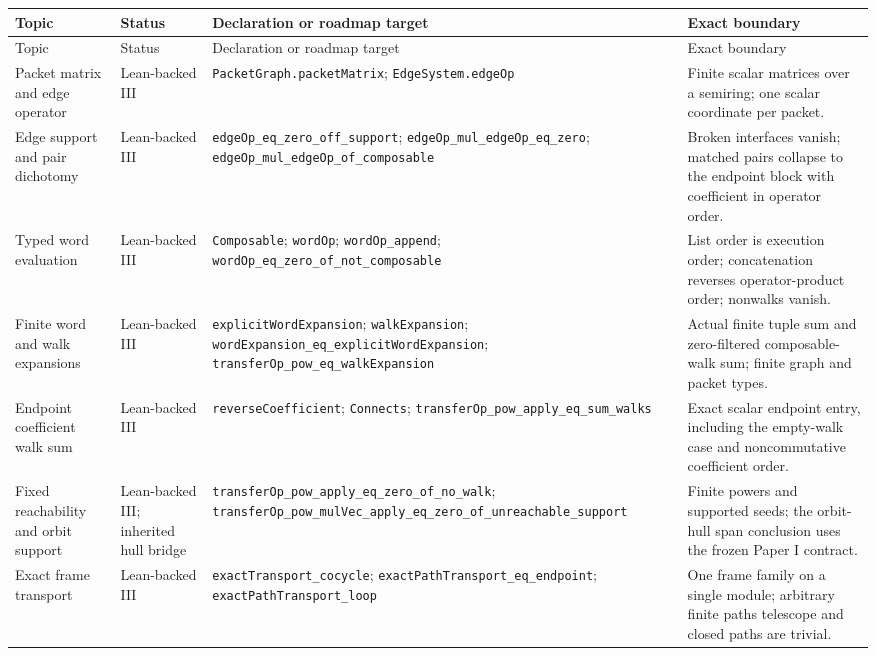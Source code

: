 \documentclass[11pt,a4paper]{article}
\theoremstyle{plain}
\theoremstyle{definition}
\theoremstyle{remark}
\newcommand{\leanname}[1]{\nolinkurl{#1}}
\begin{document}
\small
\begin{longtable}{L{0.17\textwidth}L{0.18\textwidth}L{0.25\textwidth}L{0.22\textwidth}}
\toprule
Topic & Status & Declaration or roadmap target & Exact boundary\\
\midrule
\endfirsthead
\toprule
Topic & Status & Declaration or roadmap target & Exact boundary\\
\midrule
\endhead
Packet matrix and edge operator
& Lean-backed III
& \leanname{PacketGraph.packetMatrix}; \leanname{EdgeSystem.edgeOp}
& Finite scalar matrices over a semiring; one scalar coordinate per packet.\\
\addlinespace
Edge support and pair dichotomy
& Lean-backed III
& \leanname{edgeOp_eq_zero_off_support}; \leanname{edgeOp_mul_edgeOp_eq_zero}; \leanname{edgeOp_mul_edgeOp_of_composable}
& Broken interfaces vanish; matched pairs collapse to the endpoint block with coefficient in operator order.\\
\addlinespace
Typed word evaluation
& Lean-backed III
& \leanname{Composable}; \leanname{wordOp}; \leanname{wordOp_append}; \leanname{wordOp_eq_zero_of_not_composable}
& List order is execution order; concatenation reverses operator-product order; nonwalks vanish.\\
\addlinespace
Finite word and walk expansions
& Lean-backed III
& \leanname{explicitWordExpansion}; \leanname{walkExpansion}; \leanname{wordExpansion_eq_explicitWordExpansion}; \leanname{transferOp_pow_eq_walkExpansion}
& Actual finite tuple sum and zero-filtered composable-walk sum; finite graph and packet types.\\
\addlinespace
Endpoint coefficient walk sum
& Lean-backed III
& \leanname{reverseCoefficient}; \leanname{Connects}; \leanname{transferOp_pow_apply_eq_sum_walks}
& Exact scalar endpoint entry, including the empty-walk case and noncommutative coefficient order.\\
\addlinespace
Fixed reachability and orbit support
& Lean-backed III; inherited hull bridge
& \leanname{transferOp_pow_apply_eq_zero_of_no_walk}; \leanname{transferOp_pow_mulVec_apply_eq_zero_of_unreachable_support}
& Finite powers and supported seeds; the orbit-hull span conclusion uses the frozen Paper I contract.\\
\addlinespace
Exact frame transport
& Lean-backed III
& \leanname{exactTransport_cocycle}; \leanname{exactPathTransport_eq_endpoint}; \leanname{exactPathTransport_loop}
& One frame family on a single module; arbitrary finite paths telescope and closed paths are trivial.\\

\end{longtable}
\end{document}
